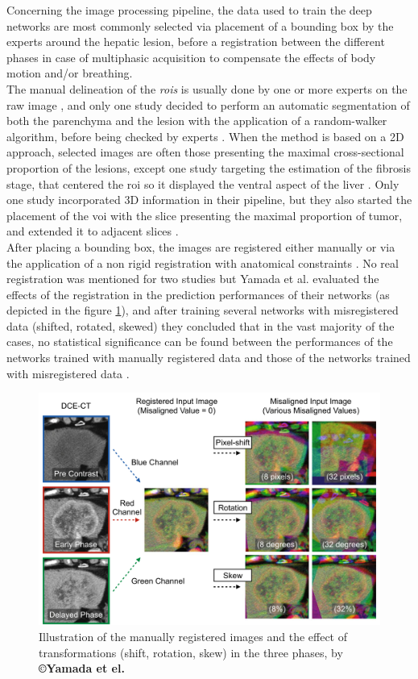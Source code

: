 Concerning the image processing pipeline, the data used to train the
deep networks are most commonly selected via placement of a bounding box
by the experts around the hepatic lesion, before a registration between
the different phases in case of multiphasic acquisition to compensate the
effects of body motion and/or breathing.\\
The manual delineation of the \emph{\ac{roi}s} is usually done by one or more
experts on the raw image \cite{Yamada2019,Wang2018,Yasaka2018a,Yasaka2018,WANG2019,Yang2019}, and only one study decided to perform an automatic segmentation of both the
parenchyma and the lesion with the application of a random-walker
algorithm, before being checked by experts \cite{Liang2018}. 
When the method is based on a 2D approach, selected images are
often those presenting the maximal cross-sectional proportion of the
lesions, except one study targeting the estimation of the fibrosis
stage, that centered the \ac{roi} so it displayed the ventral aspect
of the liver \cite{Yasaka2018a}. Only one study
incorporated 3D information in their pipeline, but they also started the
placement of the \ac{voi} with the slice presenting the maximal
proportion of tumor, and extended it to adjacent slices \cite{Yang2019}.\\
After placing a bounding box, the images are registered either manually \cite{Yamada2019,WANG2019,Wang2018} or
via the application of a non rigid registration with anatomical constraints \cite{Liang2018}. No real registration was mentioned for
two studies \cite{Peng2020,Yasaka2018a} but
Yamada et al. evaluated the effects of the registration in the
prediction performances of their networks (as depicted in the figure \ref{Yamada2019_Fig1}), 
and after training several networks with misregistered data
(shifted, rotated, skewed) they concluded that in the vast majority of
the cases, no statistical significance can be found between the
performances of the networks trained with manually registered data and
those of the networks trained with misregistered data \cite{Yamada2019}.


\begin{figure}[th!]
\centering
\includegraphics[width=0.7\linewidth]{images/image12}
\caption{Illustration of the manually registered images and the effect of transformations (shift, rotation, skew) in the three phases, by \textbf{©Yamada et el. \cite{Yamada2019}}}
\label{Yamada2019_Fig1}
\end{figure}


